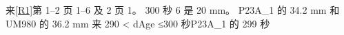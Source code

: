 \documentclass[11pt,a4paper]{article}
\numberwithin{equation}{section}
\numberwithin{figure}{section}
\begin{document}
{\cjkfont 来}\allowbreak{}\hyperlink{ref-R1}{[R1]}{\cjkfont 第}\allowbreak{} 1–2 {\cjkfont 页}\allowbreak{} 1–6 {\cjkfont 及}\allowbreak{} 2 {\cjkfont 页}\allowbreak{} 1{\cjkfont 。}\allowbreak{} 300 {\cjkfont 秒}\allowbreak{} 6 {\cjkfont 是}\allowbreak{} 20 mm{\cjkfont 。}\allowbreak{} P23A\_1 {\cjkfont 的}\allowbreak{} 34.2 mm {\cjkfont 和}\allowbreak{} UM980 {\cjkfont 的}\allowbreak{} 36.2 mm {\cjkfont 来}\allowbreak{} 290 < dAge ≤300 {\cjkfont 秒}\allowbreak{}P23A\_1 {\cjkfont 的}\allowbreak{} 299 {\cjkfont 秒}\allowbreak{}
\end{document}
